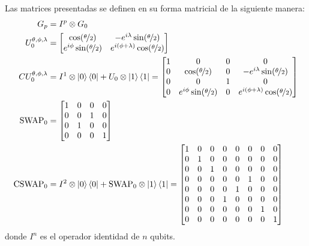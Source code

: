 \begin{definicion}
\label{def:lamrho_gates}

Las matrices presentadas se definen en su forma matricial de la siguiente manera:
\begin{align*}
    G_p &= I^p \otimes G_0 \\
    U_0^{\theta,\phi,\lambda} &= \begin{bmatrix}
    \cos(\nicefrac{\theta}{2}) & -e^{i\lambda}\sin(\nicefrac{\theta}{2}) \\ 
    e^{i\phi}\sin(\nicefrac{\theta}{2}) & e^{i(\phi+\lambda)}\cos(\nicefrac{\theta}{2})\end{bmatrix}  \\
    CU_0^{\theta,\phi,\lambda} &= I^1 \otimes \ket{0}\bra{0} + U_0 \otimes \ket{1}\bra{1} = \begin{bmatrix}
    1 & 0 & 0 & 0 \\
    0 & \cos(\nicefrac{\theta}{2}) & 0 & -e^{i\lambda}\sin(\nicefrac{\theta}{2}) \\ 
    0 & 0 & 1 & 0 \\
    0 & e^{i\phi}\sin(\nicefrac{\theta}{2}) & 0 & e^{i(\phi+\lambda)}\cos(\nicefrac{\theta}{2})\end{bmatrix}  \\
    \textrm{SWAP}_0 &= \begin{bmatrix}
    1 & 0 & 0 & 0 \\
    0 & 0 & 1 & 0 \\ 
    0 & 1 & 0 & 0 \\
    0 & 0 & 0 & 1 \end{bmatrix}  \\
    \textrm{CSWAP}_0 &= I^2 \otimes \ket{0}\bra{0} + \textrm{SWAP}_0 \otimes \ket{1}\bra{1} = \begin{bmatrix}
        1 & 0 & 0 & 0 & 0 & 0 & 0 & 0\\
        0 & 1 & 0 & 0 & 0 & 0 & 0 & 0\\
        0 & 0 & 1 & 0 & 0 & 0 & 0 & 0\\
        0 & 0 & 0 & 0 & 0 & 1 & 0 & 0\\
        0 & 0 & 0 & 0 & 1 & 0 & 0 & 0\\
        0 & 0 & 0 & 1 & 0 & 0 & 0 & 0\\
        0 & 0 & 0 & 0 & 0 & 0 & 1 & 0\\
        0 & 0 & 0 & 0 & 0 & 0 & 0 & 1
    \end{bmatrix}
\end{align*}
donde $I^n$ es el operador identidad de $n$ qubits.
\end{definicion}

